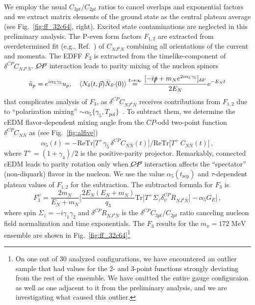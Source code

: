 \documentclass{PoS}
\newcommand{\alfive}{{\alpha_5}}
\newcommand{\CP}{{CP}}
\newcommand{\CPbar}{{\overline{CP}}}
\newcommand{\CPviol}{{\cancel{CP}}}
\begin{document}
We employ the usual $C_{3pt}/C_{2pt}$ ratios to cancel overlaps and exponential factors 
and we extract matrix elements of the ground state as the central plateau average (see
Fig.~\ref{fig:ff_32c64}, right).
Excited state contaminations are neglected in this preliminary analysis.
The P-even form factors $F_{1,2}$ are extracted from overdetermined fit (e.g.,
Ref.~\cite{Syritsyn:2009mx}) of $C_{NJ^\mu\bar N}$ combining all orientations 
of the current and momenta.
The EDFF $F_3$ is extracted from the timelike-component of 
$\delta^{\CPbar}C_{NJ^4\bar N}$.
$\CPviol$ interaction leads to parity mixing of the nucleon spinors
\begin{equation}
\tilde u_p = e^{i\alfive\gamma_5} u_p, 
\quad
\langle N_\delta(t,\vec p) \bar N_{\delta^\prime}(0)\rangle 
  \stackrel{t\to\infty}= \frac{[-i\slashed{p} 
        + m_N e^{2i\alfive\gamma_5}]_{\delta\delta^\prime}}{2E_N} e^{-E_N t}
\end{equation}
that complicates analysis of $F_3$, as $\delta^{\CPbar}C_{NJ^4\bar N}$ receives contributions 
from $F_{1,2}$ due to ``polarization mixing'' 
$\sim\alfive\{\gamma_5,T_\text{pol}\}$~\cite{Abramczyk:2017oxr}.
To subtract them, we determine the cEDM flavor-dependent mixing angle from the $\CP$-odd 
two-point function $\delta^{\CPbar}C_{N\bar N}$ as 
(see Fig.~\ref{fig:alfive}) 
\begin{equation}
\alpha_5(t) 
  = - { \mathrm{Re}\mathrm{Tr}\big[T^+ \gamma_5 \,  \delta^\CPbar C_{N\bar N}(t)\big]} 
    /  { \mathrm{Re}\mathrm{Tr}\big[T^+ \, C_{N\bar N}(t)\big] }\,,
\end{equation}
where $T^+=(1+\gamma_4)/2$ is the positive-parity projector.
Remarkably, connected cEDM leads to parity rotation only when $\CPviol$ interaction affects the
``spectator'' (non-diquark) flavor in the nucleon.
We use the value $\alfive(t_\text{sep})$ and $\tau$-dependent plateau values of $F_{1,2}$ 
for the subtraction. 
The subtracted formula for $F_3$ is~\cite{Abramczyk:2017oxr}
\begin{equation}
F_3^\psi = \frac{2m_N}{E_N + m_N} \Big[
  \frac{2E_N(E_N+m_N)}{q_3}\mathrm{Tr}\big[T^+ \Sigma_z 
      \delta^{\CPbar}_\psi R_{N J^4 \bar{N}}\big]
  -\alfive G_E \Big]\,,
\end{equation}
where spin $\Sigma_z=-i\gamma_1\gamma_2$ and 
$\delta^{\CPbar} R_{N J^4 \bar{N}}$ is the $\delta^{\CPbar}C_{3pt}/C_{2pt}$ ratio canceling 
nucleon field normalization and time exponentials.
The $F_3$ results for the $m_\pi=172\text{ MeV}$ ensemble are shown in 
Fig.~\ref{fig:ff_32c64}\footnote{
  On one out of 30 analyzed configurations, we have encountered an outlier sample that had
  values for the 2- and 3-point functions strongly deviating from the rest of the ensemble. 
  We have omitted the entire gauge configuraion as well as one adjacent to it from the 
  preliminary analysis, and we are investigating what caused this outlier.
}
\end{document}
